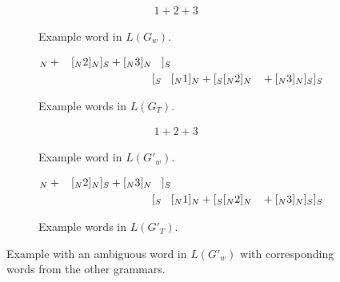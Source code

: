 \documentclass[acmsmall,review,anonymous]{acmart}\settopmatter{printfolios=true,printccs=false,printacmref=false}
\begin{document}
\begin{figure*}[ht]
  \begin{subfigure}[b]{.45\linewidth}
    \begin{align*}
      1 + 2 + 3
    \end{align*}
    \caption{Example word in $L(G_w)$.}
  \end{subfigure}
  \begin{subfigure}[b]{.45\linewidth}
      \begin{align*}
        [_S           [_S  &[_N 1 ]_N + \hphantom{[_S} [_N 2 ]_N           ]_S  + [_N 3 ]_N \hphantom{]_S} ]_S \\
        [_S \hphantom{[_S} &[_N 1 ]_N +           [_S  [_N 2 ]_N \hphantom{]_S} + [_N 3 ]_N           ]_S  ]_S
      \end{align*}
    \caption{Example words in $L(G_T)$.}
  \end{subfigure}

  \begin{subfigure}[b]{.45\linewidth}
    \begin{align*}
      1 + 2 + 3
    \end{align*}
    \caption{Example word in $L(G'_w)$.}
  \end{subfigure}
  \begin{subfigure}[b]{.45\linewidth}
      \begin{align*}
        [_S            [_S &[_N 1 ]_N + \hphantom{[_S} [_N 2 ]_N            ]_S + [_N 3 ]_N \hphantom{]_S}]_S \\
        [_S \hphantom{[_S} &[_N 1 ]_N +            [_S [_N 2 ]_N \hphantom{]_S} + [_N 3 ]_N ]_S ]_S
      \end{align*}
    \caption{Example words in $L(G'_T)$.}
  \end{subfigure}
  \caption{Example with an ambiguous word in $L(G'_w)$ with corresponding words from the other grammars.}
  \label{fig:ambig-example-square}
\end{figure*}
\end{document}
